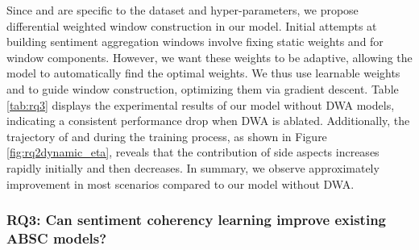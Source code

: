 Since  and  are specific to the dataset and hyper-parameters, we propose differential weighted window construction in our model. Initial attempts at building sentiment aggregation windows involve fixing static weights  and  for window components. However, we want these weights to be adaptive, allowing the model to automatically find the optimal weights. We thus use learnable weights  and  to guide window construction, optimizing them via gradient descent. Table \ref{tab:rq3} displays the experimental results of our model without DWA models, indicating a consistent performance drop when DWA is ablated. Additionally, the trajectory of  and  during the training process, as shown in Figure \ref{fig:rq2dynamic_eta}, reveals that the contribution of side aspects increases rapidly initially and then decreases. In summary, we observe approximately  improvement in most scenarios compared to our model without DWA.

\subsubsection*{RQ3: Can sentiment coherency learning improve existing ABSC models?}

